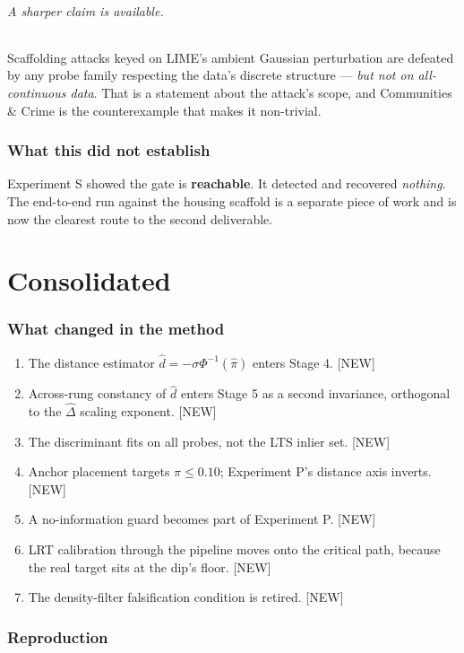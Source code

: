 \documentclass[11pt]{article}
\newcommand{\dhat}{\hat{d}}
\newcommand{\pihat}{\hat{\pi}}
\newcommand{\Dhat}{\hat{\Delta}}
\newcommand{\provtag}[2]{{\footnotesize\sffamily\textcolor{#1}{[#2]}}}
\newcommand{\NEWT}{\provtag{newmag}{NEW}}
\begin{document}
\paragraph{A sharper claim is available.} Scaffolding attacks keyed on LIME's ambient Gaussian
perturbation are defeated by any probe family respecting the data's discrete structure ---
\emph{but not on all-continuous data}. That is a statement about the attack's scope, and
Communities \& Crime is the counterexample that makes it non-trivial.

\section{What this did not establish}

Experiment S showed the gate is \textbf{reachable}. It detected and recovered \emph{nothing}. The
end-to-end run against the housing scaffold is a separate piece of work and is now the clearest
route to the second deliverable.

\part{Consolidated}

\section{What changed in the method}

\begin{enumerate}
\item The distance estimator $\dhat = -\sigma\Phi^{-1}(\pihat)$ enters Stage 4. \NEWT
\item Across-rung constancy of $\dhat$ enters Stage 5 as a second invariance, orthogonal to the
$\Dhat$ scaling exponent. \NEWT
\item The discriminant fits on all probes, not the LTS inlier set. \NEWT
\item Anchor placement targets $\pi \le 0.10$; Experiment P's distance axis inverts. \NEWT
\item A no-information guard becomes part of Experiment P. \NEWT
\item LRT calibration through the pipeline moves onto the critical path, because the real target
sits at the dip's floor. \NEWT
\item The density-filter falsification condition is retired. \NEWT
\end{enumerate}

\section{Reproduction}
\end{document}
